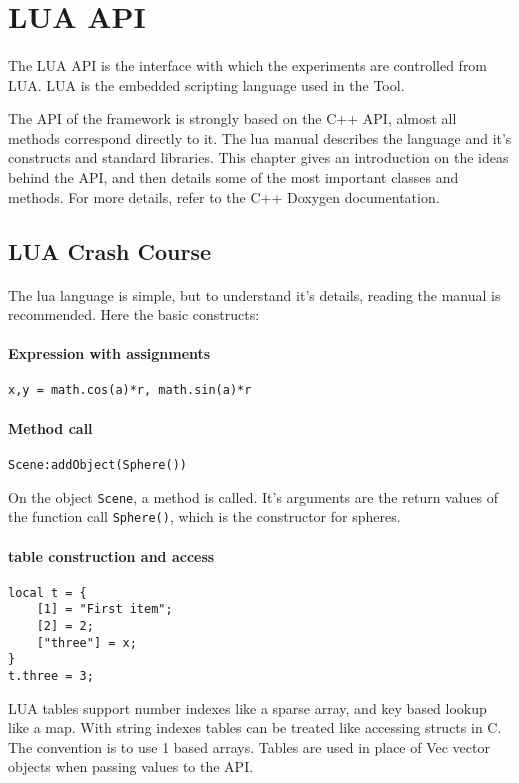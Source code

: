 \section{LUA API}
\paragraph{}
The LUA API is the interface with which the experiments are controlled from LUA.
LUA is the embedded scripting language used in the Tool.

The API of the framework is strongly based on the C++ API, almost all methods correspond directly to it.
The lua manual\cite{lua} describes the language and it's constructs and standard libraries.
This chapter gives an introduction on the ideas behind the API, and then details some of the most important classes and methods. For more details, refer to the C++ Doxygen documentation.


\subsection{LUA Crash Course}
\paragraph{}
The lua language is simple, but to understand it's details, reading the manual\cite{lua} is recommended.
Here the basic constructs:

\paragraph{Expression with assignments}
\begin{verbatim}
x,y = math.cos(a)*r, math.sin(a)*r
\end{verbatim}

\paragraph{Method call}
\begin{verbatim}
Scene:addObject(Sphere())
\end{verbatim}
On the object  \texttt{Scene}, a method is called. It's arguments are the return values of the function call \texttt{Sphere()}, which is the constructor for spheres.

\paragraph{table construction and access}
\begin{verbatim}
local t = {
    [1] = "First item";
    [2] = 2;
    ["three"] = x;
}
t.three = 3;
\end{verbatim}
LUA tables support number indexes like a sparse array, and key based lookup like a map.
With string indexes tables can be treated like accessing structs in C.
The convention is to use 1 based arrays.
Tables are used in place of Vec vector objects when passing values to the API.

